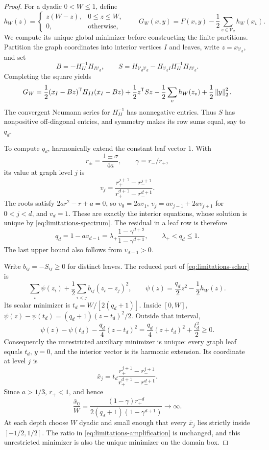 \begin{proof}
For a dyadic $0<W\le1$, define
\[
 h_W(z)=\begin{cases}z(W-z),&0\le z\le W,\\0,&\text{otherwise},\end{cases}
 \qquad
 G_W(x,y)=F(x,y)-\frac12\sum_{v\in\mathcal V_d}h_W(x_v).
\]
We compute its unique global minimizer before constructing the finite
partitions. Partition the graph coordinates into interior vertices $I$
and leaves, write $z=x_{\mathcal V_d}$, and set
\[
 B=-H_{II}^{-1}H_{I\mathcal V_d},\qquad
 S=H_{\mathcal V_d\mathcal V_d}
       -H_{\mathcal V_d I}H_{II}^{-1}H_{I\mathcal V_d}.
\]
Completing the square yields
\begin{equation}\label{eq:limitations-schur}
 G_W=\frac12(x_I-Bz)^{\mathsf T}H_{II}(x_I-Bz)
       +\frac12z^{\mathsf T}Sz-\frac12\sum_vh_W(z_v)
       +\frac12\left\lVert y\right\rVert_2^2.
\end{equation}
The convergent Neumann series for $H_{II}^{-1}$ has nonnegative
entries. Thus $S$ has nonpositive off-diagonal entries, and symmetry
makes its row sums equal, say to $q_d$.

To compute $q_d$, harmonically extend the constant leaf vector $1$.
With
\[
 r_\pm=\frac{1\pm\sigma}{4a},\qquad \gamma=r_-/r_+,
\]
its value at graph level $j$ is
\[
 v_j=\frac{r_+^{j+1}-r_-^{j+1}}
              {r_+^{d+1}-r_-^{d+1}}.
\]
The roots satisfy $2ar^2-r+a=0$, so
$v_0=2av_1$, $v_j=av_{j-1}+2av_{j+1}$ for $0<j<d$, and $v_d=1$.
These are exactly the interior equations, whose solution is unique by
\cref{eq:limitations-spectrum}. The residual in a leaf row is therefore
\[
 q_d=1-av_{d-1}
     =\lambda_+\frac{1-\gamma^{d+2}}{1-\gamma^{d+1}},
 \qquad \lambda_+<q_d\le1.
\]
The last upper bound also follows from $v_{d-1}>0$.

Write $b_{ij}=-S_{ij}\ge0$ for distinct leaves. The reduced part of
\cref{eq:limitations-schur} is
\[
 \sum_i\psi(z_i)+\frac12\sum_{i<j}b_{ij}(z_i-z_j)^2,
 \qquad \psi(z)=\frac{q_d}2z^2-\frac12h_W(z).
\]
Its scalar minimizer is $t_d=W/[2(q_d+1)]$. Inside $[0,W]$,
$\psi(z)-\psi(t_d)=(q_d+1)(z-t_d)^2/2$. Outside that interval,
\[
 \psi(z)-\psi(t_d)-\frac{q_d}4(z-t_d)^2
       =\frac{q_d}4(z+t_d)^2+\frac{t_d^2}2\ge0.
\]
Consequently the unrestricted auxiliary minimizer is unique: every
graph leaf equals $t_d$, $y=0$, and the interior vector is its harmonic
extension. Its coordinate at level $j$ is
\[
 \bar x_j=t_d
       \frac{r_+^{j+1}-r_-^{j+1}}{r_+^{d+1}-r_-^{d+1}}.
\]
Since $a>1/3$, $r_+<1$, and hence
\begin{equation}\label{eq:limitations-amplification}
 \frac{\bar x_0}{W}
   =\frac{(1-\gamma)r_+^{-d}}
           {2(q_d+1)(1-\gamma^{d+1})}\longrightarrow\infty.
\end{equation}
At each depth choose $W$ dyadic and small enough that every $\bar x_j$
lies strictly inside $[-1/2,1/2]$. The ratio in
\cref{eq:limitations-amplification} is unchanged, and this unrestricted
minimizer is also the unique minimizer on the domain box.


\end{proof}
